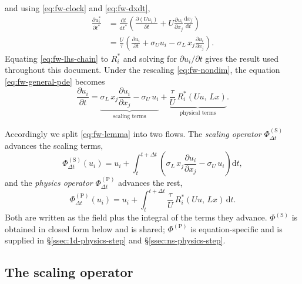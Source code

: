 \documentclass{article}
\begin{document}
and using \eqref{eq:fw-clock} and \eqref{eq:fw-dxdt},
\begin{equation}\label{eq:fw-lhs-chain}
  \begin{aligned}
  \frac{\partial u_i^*}{\partial t^*}
  &= \frac{\mathrm{d} t}{\mathrm{d} t^*}\left(
      \frac{\partial (U u_i)}{\partial t}
      + U \frac{\partial u_i}{\partial x_j} \frac{\mathrm{d} x_j}{\mathrm{d} t}
    \right) \\
  &= \frac{U}{\tau}\left(
      \frac{\partial u_i}{\partial t}
      + \sigma_U u_i
      - \sigma_L\, x_j \frac{\partial u_i}{\partial x_j}
    \right).
  \end{aligned}
\end{equation}
Equating \eqref{eq:fw-lhs-chain} to $R_i^*$ and solving for
$\partial u_i / \partial t$ gives the result used throughout this document.
Under the rescaling \eqref{eq:fw-nondim}, the equation \eqref{eq:fw-general-pde} becomes
\begin{equation}\label{eq:fw-lemma}
  \frac{\partial u_i}{\partial t}
  = \underbrace{\sigma_L\, x_j \frac{\partial u_i}{\partial x_j}
    - \sigma_U\, u_i}_{\text{scaling terms}}
  + \underbrace{\frac{\tau}{U}\, R_i^*(U u,\, L x)}_{\text{physical terms}} .
\end{equation}
\par

Accordingly we split \eqref{eq:fw-lemma} into two flows. The \emph{scaling
operator} $\Phi_{\Delta t}^{(\mathrm{S})}$ advances the scaling terms,
\begin{equation}\label{eq:fw-scaling-flow}
  \Phi_{\Delta t}^{(\mathrm{S})}(u_i)
  = u_i + \int_t^{t + \Delta t}
    \left( \sigma_L\, x_j \frac{\partial u_i}{\partial x_j} - \sigma_U\, u_i \right)
    \mathrm{d} t,
\end{equation}
and the \emph{physics operator} $\Phi_{\Delta t}^{(\mathrm{P})}$ advances the
rest,
\begin{equation}\label{eq:fw-physics-flow}
  \Phi_{\Delta t}^{(\mathrm{P})}(u_i)
  = u_i + \int_t^{t + \Delta t} \frac{\tau}{U}\, R_i^*(U u,\, L x)\, \mathrm{d} t .
\end{equation}
Both are written as the field plus the integral of the terms they advance.
$\Phi^{(\mathrm{S})}$ is obtained in closed form below and is shared;
$\Phi^{(\mathrm{P})}$ is equation-specific and is supplied in
\S\ref{ssec:1d-physics-step} and \S\ref{ssec:ns-physics-step}.

\subsection{The scaling operator}\label{ssec:fw-scaling-operator}
\end{document}

